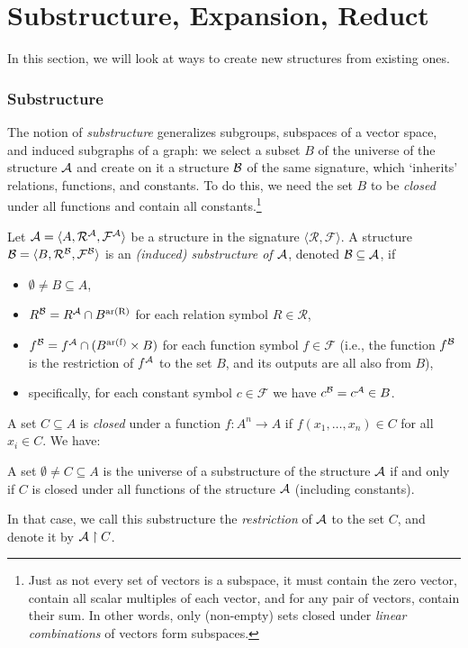 \section{Substructure, Expansion, Reduct}

In this section, we will look at ways to create new structures from existing ones.

\subsubsection{Substructure}

The notion of \emph{substructure} generalizes subgroups, subspaces of a vector space, and induced subgraphs of a graph: we select a subset $B$ of the universe of the structure $\mathcal{A}$ and create on it a structure $\mathcal{B}$ of the same signature, which `inherits' relations, functions, and constants. To do this, we need the set $B$ to be \emph{closed} under all functions and contain all constants.\footnote{Just as not every set of vectors is a subspace, it must contain the zero vector, contain all scalar multiples of each vector, and for any pair of vectors, contain their sum. In other words, only (non-empty) sets closed under \emph{linear combinations} of vectors form subspaces.}

\begin{definition}[Substructure]
Let $\mathcal{A}=\langle A,\mathcal R^\mathcal A,\mathcal F^\mathcal A\rangle$ be a structure in the signature $\langle\mathcal R,\mathcal F\rangle$. A structure $\mathcal{B}=\langle B,\mathcal R^\mathcal B,\mathcal F^\mathcal B\rangle$ is an \emph{(induced) substructure of $\mathcal{A}$}, denoted $\mathcal{B}\subseteq\mathcal{A}$, if
\begin{itemize}
    \item $\emptyset\neq B\subseteq A$,
    \item $R^{\mathcal{B}}=R^{\mathcal{A}}\cap B^{\mathrm{ar(R)}}$ for each relation symbol $R\in \mathcal R$,
    \item $f^{\mathcal{B}}=f^{\mathcal{A}}\cap (B^{\mathrm{ar(f)}}\times B)$ for each function symbol $f\in \mathcal F$ (i.e., the function $f^{\mathcal{B}}$ is the restriction of $f^{\mathcal{A}}$ to the set $B$, and its outputs are all also from $B$),
    \item specifically, for each constant symbol $c\in\mathcal F$ we have $c^{\mathcal{B}}=c^{\mathcal{A}}\in B$.
\end{itemize}
\end{definition}
A set $C\subseteq A$ is \emph{closed} under a function $f:A^n\to A$ if $f(x_1,\dots,x_n)\in C$ for all $x_i\in C$. We have:
\begin{observation}
    A set $\emptyset\neq C\subseteq A$ is the universe of a substructure of the structure $\mathcal{A}$ if and only if $C$ is closed under all functions of the structure $\mathcal{A}$ (including constants).
\end{observation}
In that case, we call this substructure the \emph{restriction} of $\mathcal{A}$ to the set $C$, and denote it by $\mathcal{A}\restriction C$.

